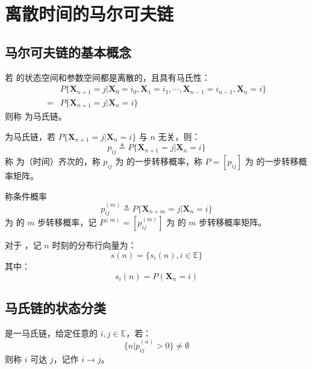 \section{离散时间的马尔可夫链}
    \subsection{马尔可夫链的基本概念}
        \begin{definition}[马尔可夫链]
            若 \MarkovChain 的状态空间和参数空间都是离散的，且具有马氏性：
            \begin{align*}
                &P\{ \textbf{X}_{n+1} = j | \textbf{X}_0 = i_0, \textbf{X}_1 = i_1, \cdots, \textbf{X}_{n - 1} = i_{n - 1}, \textbf{X}_n = i \} \\= &P\{ \textbf{X}_{n + 1} = j | \textbf{X}_n = i \}
            \end{align*}
            则称 \MarkovChain 为马氏链。
        \end{definition}

        \begin{definition}[一步转移概率]
            \MarkovChain 为马氏链，若 $P\{\textbf{X}_{n+1} = j | \textbf{X}_{n} = i\}$ 与 $n$ 无关，则：
            $$
            p_{ij} \triangleq P\{\textbf{X}_{n+1} = j | \textbf{X}_{n} = i\}
            $$
            称 \MarkovChain 为（时间）齐次的，称 $ p_{ij}$ 为 \MarkovChain 的一步转移概率，称 $P = \left[p_{ij}\right]$ 为 \MarkovChain 的一步转移概率矩阵。
        \end{definition}

        \begin{definition}[多步转移概率]
            称条件概率
            $$
            p_{ij}^{(m)} \triangleq P\{\textbf{X}_{n+m} = j | \textbf{X}_{n} = i\}
            $$ 
            为 \MarkovChain 的 $m$ 步转移概率，记 $P^{(m)} = \left[p_{ij}^{(m)}\right]$ 为 \MarkovChain 的 $m$ 步转移概率矩阵。
        \end{definition}

        \begin{definition}[概率分布行向量]
            对于 \MarkovChain，记 $n$ 时刻的分布行向量为：
            $$
            s(n) = \{s_i(n), i \in \mathbb{E} \}
            $$
            其中：
            $$
            s_i(n) = P(\textbf{X}_n = i)
            $$
        \end{definition}
    \subsection{马氏链的状态分类}
        \begin{definition}[可达]
            \MarkovChain 是一马氏链，给定任意的 $i, j \in \mathbb{E}$，若：
            $$
            \{n | p_{ij}^{(n)} > 0\} \neq \emptyset
            $$
            则称 $i$ 可达 $j$，记作 $ i \rightarrow j $。
        \end{definition}

